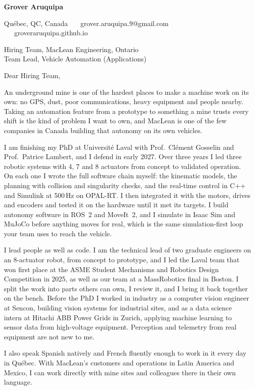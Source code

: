 \documentclass[11pt,letterpaper]{article}
\begin{document}
{\large\bfseries Grover Aruquipa}\par\vspace{-6pt}
{\small Qu\'ebec, QC, Canada \ \textbullet\ \ grover.aruquipa.9@gmail.com \ \textbullet\ \ groveraruquipa.github.io}

\vspace{4pt}
Hiring Team, MacLean Engineering, Ontario\\
Team Lead, Vehicle Automation (Applications)

Dear Hiring Team,

An underground mine is one of the hardest places to make a machine work on its own: no GPS, dust, poor communications, heavy equipment and people nearby. Taking an automation feature from a prototype to something a mine trusts every shift is the kind of problem I want to own, and MacLean is one of the few companies in Canada building that autonomy on its own vehicles.

I am finishing my PhD at Universit\'e Laval with Prof.\ Cl\'ement Gosselin and Prof.\ Patrice Lambert, and I defend in early 2027. Over three years I led three robotic systems with 4, 7 and 8 actuators from concept to validated operation. On each one I wrote the full software chain myself: the kinematic models, the planning with collision and singularity checks, and the real-time control in C++ and Simulink at 500\,Hz on OPAL-RT. I then integrated it with the motors, drives and encoders and tested it on the hardware until it met its targets. I build autonomy software in ROS~2 and MoveIt~2, and I simulate in Isaac Sim and MuJoCo before anything moves for real, which is the same simulation-first loop your team uses to reach the vehicle.

I lead people as well as code. I am the technical lead of two graduate engineers on an 8-actuator robot, from concept to prototype, and I led the Laval team that won first place at the ASME Student Mechanisms and Robotics Design Competition in 2025, as well as our team at a MassRobotics final in Boston. I split the work into parts others can own, I review it, and I bring it back together on the bench. Before the PhD I worked in industry as a computer vision engineer at Sencon, building vision systems for industrial sites, and as a data science intern at Hitachi ABB Power Grids in Zurich, applying machine learning to sensor data from high-voltage equipment. Perception and telemetry from real equipment are not new to me.

I also speak Spanish natively and French fluently enough to work in it every day in Qu\'ebec. With MacLean's customers and operations in Latin America and Mexico, I can work directly with mine sites and colleagues there in their own language.
\end{document}
